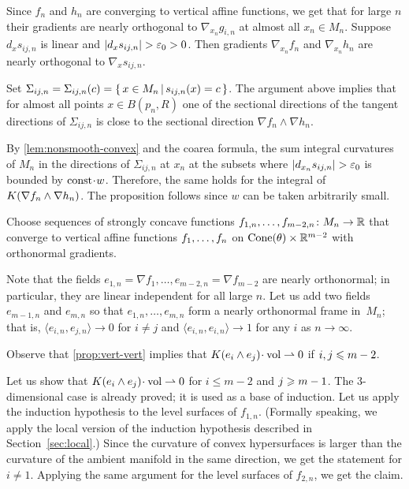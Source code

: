 Since $f_n$ and $h_n$ are converging to vertical affine functions, we get that for large $n$ their gradients are nearly orthogonal to $\nabla_{x_n} g_{i,n}$ at almost all $x_n\in M_n$.
Suppose $d_xs_{ij,n}$ is linear and $|d_xs_{ij,n}|>\eps_0>0$.
Then gradients $\nabla_{x_n}f_n$ and $\nabla_{x_n}h_n$ are nearly orthogonal to $\nabla_x s_{ij,n}$.

Set $\Sigma_{ij,n}=\Sigma_{ij,n}(c)=\left\{\,x\in M_n\,\middle|\,s_{ij,n}(x)=c\,\right\}$.
The argument above implies that for almost all points $x\in B(p_n,R)$ one of the sectional directions of the tangent directions of $\Sigma_{ij,n}$ is close to the sectional direction $\nabla f_n\wedge\nabla h_n$.

By \ref{lem:nonsmooth-convex} and the coarea formula, the sum integral curvatures of $M_n$ in the directions of $\Sigma_{ij,n}$ at $x_n$ at the subsets where $|d_{x_n}s_{ij,n}|>\eps_0$ is bounded by $\const\cdot w$.
Therefore, the same holds for the integral of $K(\nabla f_n\zz\wedge\nabla h_n)$.
The proposition follows since $w$ can be taken arbitrarily small.
\qeds


Choose sequences of strongly concave functions $f_{1,n},\dots, f_{m-2,n}\colon M_n\to \mathbb{R}$ that converge to vertical affine functions $f_1,\zz\dots,f_n$ on  $\operatorname{Cone}(\theta)\times \mathbb{R}^{m-2}$ with orthonormal gradients.

Note that the fields $e_{1,n}=\nabla f_1,\dots,e_{m-2,n}=\nabla f_{m-2}$ are nearly orthonormal;
in particular, they are linear independent for all large $n$.
Let us add two fields $e_{m-1,n}$ and $e_{m,n}$  so that $e_{1,n},\dots, e_{m,n}$ form a nearly orthonormal frame in~$M_n$;
that is, $\langle e_{i,n}, e_{j,n}\rangle\to 0$ for $i\ne j$ and $\langle e_{i,n}, e_{i,n}\rangle\to 1$ for any $i$ as $n\to\infty$.

Observe that \ref{prop:vert-vert} implies that $K(e_i\wedge e_j)\cdot\vol\rightharpoonup 0$ if $i,j\zz\le m-2$.

Let us show that $K(e_i\wedge e_j)\cdot\vol\rightharpoonup 0$ for $i\le m-2$ and $j\zz\ge m\zz-1$.
The $3$-dimensional case is already proved; it is used as a base of induction.
Let us apply the induction hypothesis to the level surfaces of $f_{1,n}$.
(Formally speaking, we apply the local version of the induction hypothesis described in Section~\ref{sec:local}.)
Since the curvature of convex hypersurfaces is larger than the curvature of the ambient manifold in the same direction, we get the statement for $i\ne 1$.
Applying the same argument for the level surfaces of $f_{2,n}$, we get the claim.

